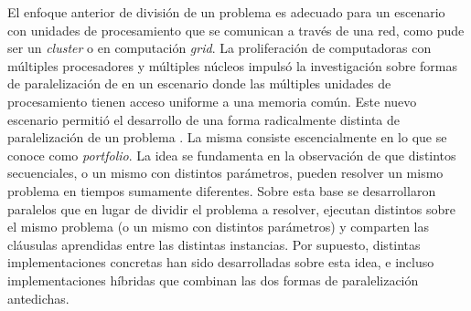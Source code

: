 El enfoque anterior de división de un problema \sat es adecuado para un
escenario con unidades de procesamiento que se comunican a través de una red,
como pude ser un \emph{cluster} o en computación \emph{grid}. La proliferación
de computadoras con múltiples procesadores y múltiples núcleos impulsó la
investigación sobre formas de paralelización de \ssolvers en un escenario
donde las múltiples unidades de procesamiento tienen acceso uniforme a una
memoria común. Este nuevo escenario permitió el desarrollo de una forma
radicalmente distinta de paralelización de un problema \sat. La misma consiste
escencialmente en lo que se conoce como \emph{portfolio}. La idea se
fundamenta en la observación de que distintos \ssolvers secuenciales, o un
mismo \ssolver con distintos parámetros, pueden resolver un mismo problema en
tiempos sumamente diferentes. Sobre esta base se desarrollaron \ssolvers
paralelos que en lugar de dividir el problema a resolver, ejecutan distintos
\ssolvers sobre el mismo problema (o un mismo \ssolver con distintos
parámetros) y comparten las cláusulas aprendidas entre las distintas
instancias. Por supuesto, distintas implementaciones concretas han sido
desarrolladas sobre esta idea, e incluso implementaciones híbridas que
combinan las dos formas de paralelización antedichas. 


